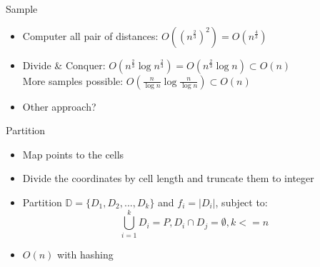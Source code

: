 \documentclass[18pt]{beamer}
\def \loose {15pt}
\begin{document}

\begin{frame}{Sample}
	\begin{itemize}
	\setlength{\itemsep}{\loose}
		\item Computer all pair of distances: $O((n^{\frac{2}{3}})^2) = O(n^{\frac{4}{3}})$
		\item Divide \& Conquer: $O(n^{\frac{2}{3}}\log n^{\frac{2}{3}}) = O(n^{\frac{2}{3}}\log n) \subset O(n)$ \\
		\hspace{1em} More samples possible: $O(\frac{n}{\log n} \log \frac{n}{\log n}) \subset O(n) $
		\item Other approach?
	\end{itemize}
\end{frame}

\begin{frame}{Partition}
	\begin{itemize}
		\setlength{\itemsep}{\loose}
		\item Map points to the cells
		\item Divide the coordinates by cell length and truncate them to integer

		\item Partition $\mathbb{D} = \{D_1, D_2, ..., D_k\}$ and $f_i = |D_i|$, subject to:
			 $$\bigcup_{i=1}^k D_i = P, D_i \cap D_j = \emptyset, k <= n$$
				\item $O(n)$ with hashing
	\end{itemize}
\end{frame}
\end{document}
